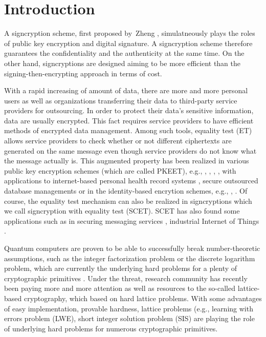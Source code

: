 \documentclass[a4paper,11pt,onecolumn]{elsarticle}
\begin{document}
	
	\maketitle
	
	\linenumbers
	\section{Introduction} \label{intro} 
	 
	A signcryption scheme, first proposed by~Zheng \cite{Zhe97}, simulatneously plays the roles of public key encryption and digital signature. A signcryption scheme therefore guarantees the confidentiality and the authenticity at the same time. On the other hand, signcryptions are designed aiming to be more efficient than the signing-then-encrypting approach in terms of cost. 
	
	With a rapid increasing of amount of data, there are more and more personal users as well as organizations transferring their data to third-party service providers for outsourcing. In order to protect their data's sensitive information, data are usually encrypted. This fact requires service providers  to have efficient methods of encrypted data management.  
	Among such tools, equality test (ET) allows service providers to check whether or not  different ciphertexts are generated on the same message even though service providers do not know what the message actually is. This augmented property has been realized in various public key encryption schemes (which are called PKEET), e.g., \cite{YTHW10}, \cite{LLS+20}, \cite{LSQ18}, \cite{Duongetal2019}, \cite{DFS+20} with applications to internet-based personal health record systems \cite{Tan11}, secure outsourced database managements \cite{YTHW10} or  in the identity-based encrytion schemes, e.g.,  \cite{DLRS19}, \cite{NSD+20}.  Of course, the equality test mechanism can also be realized  in signcryptions which we call signcryption with equality test (SCET). SCET has also found some applications such as in  securing messaging services \cite{WPD+19},   industrial Internet of Things \cite{XZH+20}.
	
	Quantum computers are proven to be able to successfully break number-theoretic assumptions, such as the integer factorization problem or the discrete logarithm problem, which are currently the underlying hard problems for a plenty of cryptographic primitives \cite{Sho97}. Under the threat, research community has recently been paying more and more attention as well as resources to the so-called lattice-based cryptography, which based on hard lattice problems. With some advantages of easy implementation, provable hardness, lattice problems (e.g., learning with errors problem (LWE), short integer solution problem (SIS) are playing the role of underlying hard problems for numerous cryptographic primitives.  \\     
	
\end{document}
